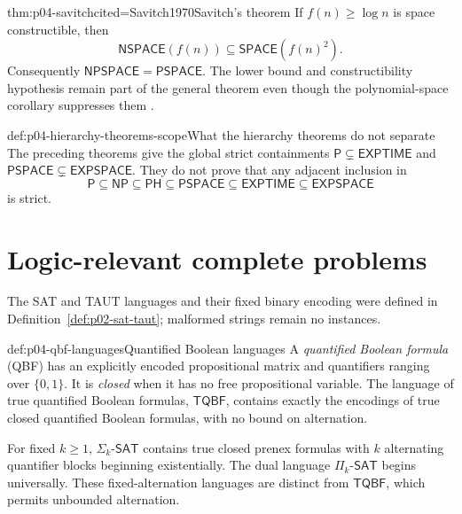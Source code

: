 \begin{hbtheorem}{thm:p04-savitch}{cited=Savitch1970}{Savitch's theorem}
If \(f(n)\geq\log n\) is space constructible, then
\[
 \mathsf{NSPACE}(f(n))
 \subseteq \mathsf{SPACE}(f(n)^2).
\]
Consequently \(\mathsf{NPSPACE}=\mathsf{PSPACE}\).  The lower bound and
constructibility hypothesis remain part of the general theorem even though
the polynomial-space corollary suppresses them
\cite[thm.~4.12]{AroraBarak2009}.
\end{hbtheorem}

\begin{hbwarning}{def:p04-hierarchy-theorems-scope}{What the hierarchy theorems do not separate}
The preceding theorems give the global strict containments
\(\mathsf P\subsetneq\mathsf{EXPTIME}\) and
\(\mathsf{PSPACE}\subsetneq\mathsf{EXPSPACE}\).  They do not prove that
any adjacent inclusion in
\[
 \mathsf P\subseteq\mathsf{NP}\subseteq\mathsf{PH}
 \subseteq\mathsf{PSPACE}\subseteq\mathsf{EXPTIME}
 \subseteq\mathsf{EXPSPACE}
\]
is strict.
\end{hbwarning}

\section{Logic-relevant complete problems}
\label{sec:p04-complexity-complete-problems}

The SAT and TAUT languages and their fixed binary encoding were defined in
Definition~\ref{def:p02-sat-taut}; malformed strings remain no instances.

\begin{hbdefinition}{def:p04-qbf-languages}{Quantified Boolean languages}
A \emph{quantified Boolean formula} (QBF) has an explicitly encoded propositional
matrix and quantifiers ranging over \(\{0,1\}\).  It is \emph{closed} when it
has no free propositional variable.  The language of true quantified Boolean
formulas, \(\mathsf{TQBF}\), contains
exactly the encodings of true closed quantified Boolean formulas, with no
bound on alternation.

For fixed \(k\geq1\), \(\Sigma_k\text{-}\mathsf{SAT}\) contains true closed
prenex formulas with \(k\) alternating quantifier blocks beginning
existentially.  The dual language \(\Pi_k\text{-}\mathsf{SAT}\) begins
universally.  These fixed-alternation languages are distinct from
\(\mathsf{TQBF}\), which permits unbounded alternation.
\end{hbdefinition}

